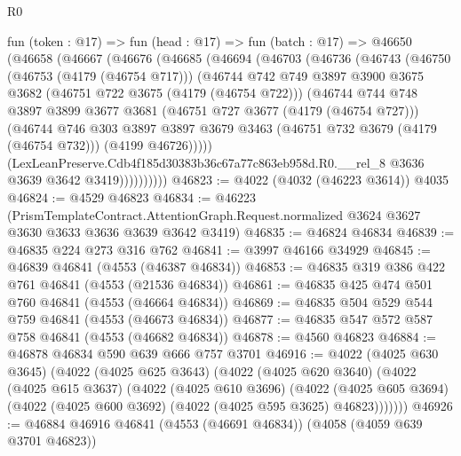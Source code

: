 \begin{lexlean}{R0}
\begin{coremodule}
    fun (token : @17) =>
    fun (head : @17) =>
    fun (batch : @17) =>
    @46650
      (@46658
        (@46667
          (@46676
            (@46685
              (@46694
                (@46703
                  (@46736
                    (@46743
                      (@46750
                        (@46753 (@4179 (@46754 @717)))
                        (@46744
                          @742
                          @749
                          @3897
                          @3900
                          @3675
                          @3682
                          (@46751 @722 @3675 (@4179 (@46754 @722)))
                          (@46744
                            @744
                            @748
                            @3897
                            @3899
                            @3677
                            @3681
                            (@46751 @727 @3677 (@4179 (@46754 @727)))
                            (@46744
                              @746
                              @303
                              @3897
                              @3897
                              @3679
                              @3463
                              (@46751 @732 @3679 (@4179 (@46754 @732)))
                              (@4199 @46726)))))
                      (LexLeanPreserve.Cdb4f185d30383b36c67a77c863eb958d.R0.__rel_8
                        @3636
                        @3639
                        @3642
                        @3419))))))))))
@46823 := @4022 (@4032 (@46223 @3614)) @4035
@46824 := @4529 @46823
@46834 := @46223
    (PrismTemplateContract.AttentionGraph.Request.normalized
      @3624
      @3627
      @3630
      @3633
      @3636
      @3639
      @3642
      @3419)
@46835 := @46824 @46834
@46839 := @46835 @224 @273 @316 @762
@46841 := @3997 @46166 @34929
@46845 := @46839 @46841 (@4553 (@46387 @46834))
@46853 := @46835 @319 @386 @422 @761 @46841 (@4553 (@21536 @46834))
@46861 := @46835 @425 @474 @501 @760 @46841 (@4553 (@46664 @46834))
@46869 := @46835 @504 @529 @544 @759 @46841 (@4553 (@46673 @46834))
@46877 := @46835 @547 @572 @587 @758 @46841 (@4553 (@46682 @46834))
@46878 := @4560 @46823
@46884 := @46878 @46834 @590 @639 @666 @757 @3701
@46916 := @4022
    (@4025 @630 @3645)
    (@4022
      (@4025 @625 @3643)
      (@4022
        (@4025 @620 @3640)
        (@4022
          (@4025 @615 @3637)
          (@4022
            (@4025 @610 @3696)
            (@4022
              (@4025 @605 @3694)
              (@4022 (@4025 @600 @3692) (@4022 (@4025 @595 @3625) @46823)))))))
@46926 := @46884 @46916 @46841 (@4553 (@46691 @46834)) (@4058 (@4059 @639 @3701 @46823))

\end{coremodule}
\end{lexlean}
